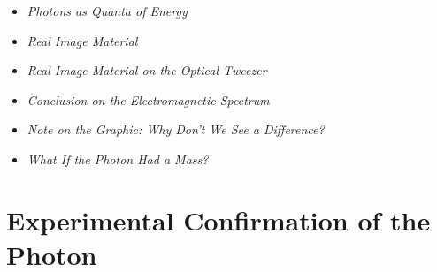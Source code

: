 \vspace{1em}
\begin{tcolorbox}[title=Mathematical Boxes,mathebox]
	\begin{itemize}
		\item \emph{Photons as Quanta of Energy} \dotfill\pageref{box:Photon als Energiequanten}
	\end{itemize}
\end{tcolorbox}

\vspace{1em}
\begin{tcolorbox}[title=Reference Boxes,hinweisbox]
	\begin{itemize}
		\item \emph{Real Image Material} \dotfill\pageref{keybox:RealesBildmaterial}
		\item \emph{Real Image Material on the Optical Tweezer} \dotfill\pageref{box:Manipulation kleiner Partikel}
		\item \emph{Conclusion on the Electromagnetic Spectrum} \dotfill\pageref{box:Fazit zum elektro}
		\item \emph{Note on the Graphic: Why Don’t \newline We See a Difference?} \dotfill\pageref{box:Warum sieht man}
	\end{itemize}
\end{tcolorbox}

\vspace{1em}
\begin{tcolorbox}[title=Hypothetical Boxes,hypobox]
	\begin{itemize}
		\item \emph{What If the Photon Had a Mass?} \dotfill\pageref{box:was wäre wenn}
	\end{itemize}
\end{tcolorbox}
\section{Experimental Confirmation of the Photon}


